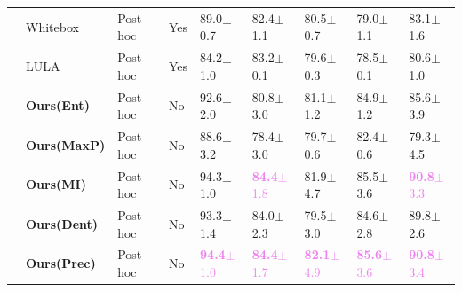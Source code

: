 \begin{table}[t]
\begin{center}
\begin{tabular}{lllllllll}
              & Whitebox & Post-hoc & Yes & 89.0$\pm$0.7 & 82.4$\pm$1.1 & 80.5$\pm$0.7 & 79.0$\pm$1.1 & 83.1$\pm$1.6   \\
              & LULA & Post-hoc & Yes & 84.2$\pm$1.0 & 83.2$\pm$0.1 & 79.6$\pm$0.3 & 78.5$\pm$0.1 & 80.6$\pm$1.0  \\
    \hline
              & \textbf{Ours(Ent)} & Post-hoc & No & 92.6$\pm$2.0 & 80.8$\pm$3.0 & 81.1$\pm$1.2 &  84.9$\pm$1.2& 85.6$\pm$3.9 \\
              & \textbf{Ours(MaxP)} & Post-hoc & No & 88.6$\pm$3.2 & 78.4$\pm$3.0 & 79.7$\pm$0.6 &  82.4$\pm$0.6& 79.3$\pm$4.5 \\
              & \textbf{Ours(MI)} & Post-hoc & No & 94.3$\pm$1.0 & \textcolor{violet}{\textbf{84.4}$\pm$1.8} & 81.9$\pm$4.7 &  85.5$\pm$3.6 & \textcolor{violet}{\textbf{90.8}$\pm$3.3} \\
              & \textbf{Ours(Dent)} & Post-hoc & No & 93.3$\pm$1.4 & 84.0$\pm$2.3 & 79.5$\pm$3.0 &  84.6$\pm$2.8& 89.8$\pm$2.6 \\
              & \textbf{Ours(Prec)} & Post-hoc & No & \textcolor{violet}{\textbf{94.4}$\pm$1.0} & \textcolor{violet}{\textbf{84.4}$\pm$1.7} & \textcolor{violet}{\textbf{82.1}$\pm$4.9} &  \textcolor{violet}{\textbf{85.6}$\pm$3.6}&
              \textcolor{violet}{\textbf{90.8}$\pm$3.4} \\
    \toprule
  \end{tabular}
  \label{table:OOD}
  \end{center}
  \vspace{-2em}
\end{table}

